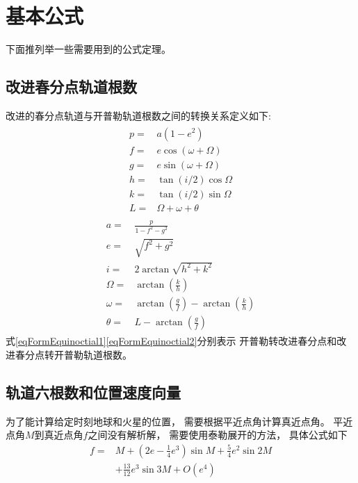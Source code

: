 \section{基本公式}
下面推列举一些需要用到的公式定理。

\subsection{改进春分点轨道根数}
改进的春分点轨道与开普勒轨道根数之间的转换关系定义如下\cite{mxubo2016}:
\begin{align}
    \begin{aligned}
        p =& a\left(1-e^{2}\right) \\
        f =& e \cos (\omega+\Omega) \\
        g =& e \sin (\omega+\Omega) \\
        h =& \tan (i / 2) \cos \Omega \\
        k =& \tan (i / 2) \sin \Omega \\
        L =& \Omega+\omega+\theta
    \end{aligned} \label{eqFormEquinoctial1}
\end{align}
\begin{align}
    \begin{aligned}
        a =& \frac{p}{1-f^{2}-g^{2}} \\
        e =& \sqrt{f^{2}+g^{2}} \\
        i =& 2 \arctan \sqrt{h^{2}+k^{2}} \\
        \Omega =& \arctan \left(\frac{k}{h}\right) \\
        \omega =& \arctan \left(\frac{g}{f}\right)-\arctan \left(\frac{k}{h}\right) \\
        \theta =& L-\arctan \left(\frac{g}{f}\right)
    \end{aligned} \label{eqFormEquinoctial2}
\end{align}
式\eqref{eqFormEquinoctial1}\eqref{eqFormEquinoctial2}分别表示
开普勒转改进春分点和改进春分点转开普勒轨道根数。

\subsection{轨道六根数和位置速度向量}
为了能计算给定时刻地球和火星的位置，
需要根据平近点角计算真近点角。
平近点角$M$到真近点角$f$之间没有解析解，
需要使用泰勒展开的方法，
具体公式如下\cite{msmart1977}
\begin{align*}
    f =& M+\left(2e-\frac{1}{4}e^3\right)\sin{M}
    + {\frac{5}{4}}e^2\sin{2M} \\
    &+ {\frac{13}{12}}e^3\sin{3M}+O(e^4)
\end{align*}

